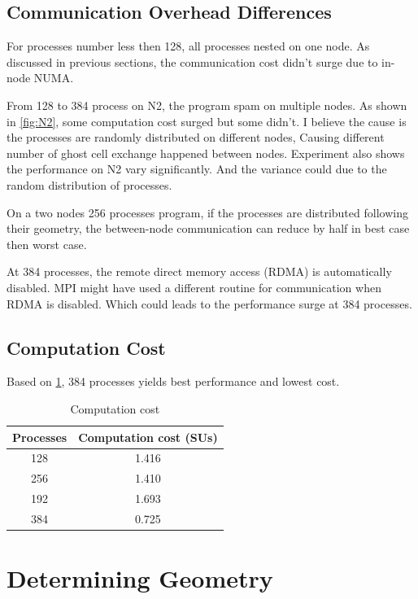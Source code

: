 \documentclass[12pt]{article}
\begin{document}
\subsection{Communication Overhead Differences}

For processes number less then 128, all processes nested on one node.
As discussed in previous sections, the communication cost didn't surge due to in-node NUMA.

From 128 to 384 process on N2,
the program spam on multiple nodes.
As shown in \ref{fig:N2}, some computation cost surged but some didn't.
I believe the cause is the processes are randomly distributed on different nodes,
Causing different number of ghost cell exchange happened between nodes.
Experiment also shows the performance on N2 vary significantly. 
And the variance could due to the random distribution of processes.

On a two nodes 256 processes program,
if the processes are distributed following their geometry,
the between-node communication can reduce by half in best case then worst case.

At 384 processes,
the remote direct memory access (RDMA) is automatically disabled.
MPI might have used a different routine for communication when RDMA is disabled.
Which could leads to the performance surge at 384 processes.

\subsection{Computation Cost}
Based on \ref{tab:computation-cost}, 384 processes yields best performance and lowest cost.

\begin{table}[h!]
\centering
\begin{tabular}{|c|c|}
\hline
\textbf{Processes} & \textbf{Computation cost} (SUs) \\
\hline
128 & 1.416 \\
256 & 1.410 \\
192 & 1.693 \\
384 & 0.725 \\
\hline
\end{tabular}
\caption{Computation cost}
\label{tab:computation-cost}
\end{table}

\section{Determining Geometry}
\end{document}
